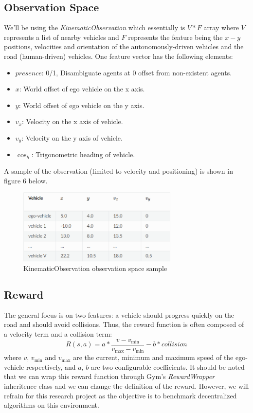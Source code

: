 \documentclass[conference]{IEEEtran}
\begin{document}
\subsection{Observation Space}
We'll be using the \textit{KinematicObservation} which essentially is  $V*F$  array where  $V$ represents a list of nearby vehicles and  $F$  represents the feature being the  $x-y$  positions, velocities and orientation of the autonomously-driven
vehicles and the road (human-driven) vehicles. One feature vector has the following elements:
\begin{itemize}
    \item $presence$: 0/1, Disambiguate agents at 0 offset from non-existent agents.
    \item $x$: World offset of ego vehicle on the x axis.
    \item $y$: World offset of ego vehicle on the y axis.
    \item $v_{x}$: Velocity on the x axis of vehicle.
    \item $v_{y}$: Velocity on the y axis of vehicle.
    \item $\cos_{h}$: Trigonometric heading of vehicle.
\end{itemize}
A sample of the observation (limited to velocity and positioning) is shown in figure 6 below.
\begin{figure}[hbt!]
\centerline{\includegraphics[width=80mm]{images/observation_space.png}}
\caption{KinematicObservation observation space sample}
\label{fig3}
\end{figure}

\subsection{Reward}
The general focus is on two features: a vehicle should progress quickly on the road and should avoid collisions. Thus, the reward function is often composed of a velocity term and a collision term:\\ 
\begin{equation}
    R(s,a) = a * \frac{v - {v}_{\min}}{{v}_{\max}-{v}_{\min}} - b * {collision}
\end{equation}
where  $v$, ${v}_{\min}$ and ${v}_{\max}$  are the current, minimum and maximum speed of the ego-vehicle respectively, and  $a$, $b$  are two configurable coefficients.
It should be noted that we can wrap this reward function through Gym's \textit{RewardWrapper} inheritence class and we can change the definition of the reward. However, we will refrain for this research project
as the objective is to benchmark decentralized algorithms on this environment.
\end{document}
